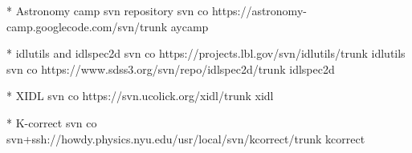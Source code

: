 * Astronomy camp svn repository
svn co https://astronomy-camp.googlecode.com/svn/trunk aycamp

* idlutils and idlspec2d
svn co https://projects.lbl.gov/svn/idlutils/trunk idlutils
svn co https://www.sdss3.org/svn/repo/idlspec2d/trunk idlspec2d

* XIDL
svn co https://svn.ucolick.org/xidl/trunk xidl

* K-correct
svn co svn+ssh://howdy.physics.nyu.edu/usr/local/svn/kcorrect/trunk kcorrect


